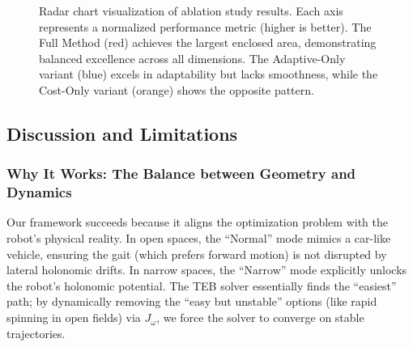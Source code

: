 \documentclass[lettersize,journal]{IEEEtran}
\begin{document}
\begin{figure}[!t]
\centering
\caption{Radar chart visualization of ablation study results. Each axis represents a normalized performance metric (higher is better). The Full Method (red) achieves the largest enclosed area, demonstrating balanced excellence across all dimensions. The Adaptive-Only variant (blue) excels in adaptability but lacks smoothness, while the Cost-Only variant (orange) shows the opposite pattern.}
\label{fig:ablation_radar}
\end{figure}

\subsection{Discussion and Limitations}

\subsubsection{Why It Works: The Balance between Geometry and Dynamics}
Our framework succeeds because it aligns the optimization problem with the robot's physical reality. In open spaces, the ``Normal'' mode mimics a car-like vehicle, ensuring the gait (which prefers forward motion) is not disrupted by lateral holonomic drifts. In narrow spaces, the ``Narrow'' mode explicitly unlocks the robot's holonomic potential. The TEB solver essentially finds the ``easiest'' path; by dynamically removing the ``easy but unstable'' options (like rapid spinning in open fields) via $J_{\dot{\omega}}$, we force the solver to converge on stable trajectories.
\end{document}
